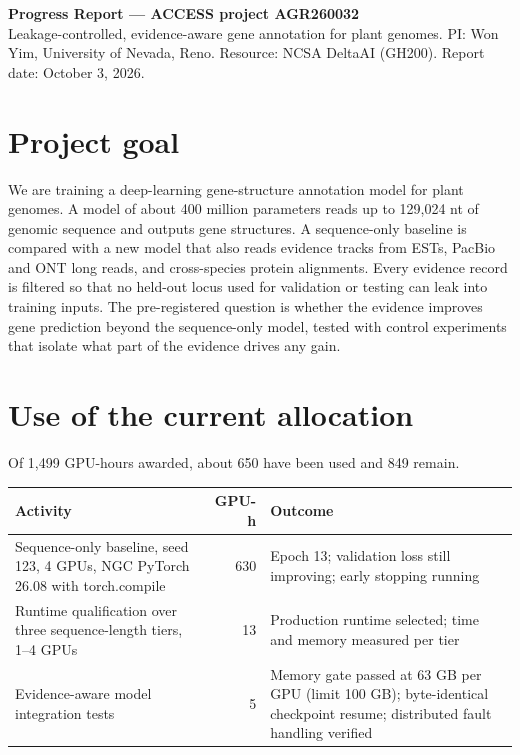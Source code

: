 \documentclass[11pt]{article}
\begin{document}
{\large\bfseries Progress Report — ACCESS project AGR260032}\\[2pt]
{\small Leakage-controlled, evidence-aware gene annotation for plant genomes. PI: Won Yim, University of Nevada, Reno. Resource: NCSA DeltaAI (GH200). Report date: October 3, 2026.}

\section{Project goal}
We are training a deep-learning gene-structure annotation model for plant genomes. A model of about 400 million parameters reads up to 129,024 nt of genomic sequence and outputs gene structures. A sequence-only baseline is compared with a new model that also reads evidence tracks from ESTs, PacBio and ONT long reads, and cross-species protein alignments. Every evidence record is filtered so that no held-out locus used for validation or testing can leak into training inputs. The pre-registered question is whether the evidence improves gene prediction beyond the sequence-only model, tested with control experiments that isolate what part of the evidence drives any gain.

\section{Use of the current allocation}
Of 1,499 GPU-hours awarded, about 650 have been used and 849 remain.

\begin{tabularx}{\linewidth}{Xrl}\toprule
Activity & GPU-h & Outcome\\\midrule
Sequence-only baseline, seed 123, 4 GPUs, NGC PyTorch 26.08 with torch.compile & 630 & Epoch 13; validation loss still improving; early stopping running\\
Runtime qualification over three sequence-length tiers, 1--4 GPUs & 13 & Production runtime selected; time and memory measured per tier\\
Evidence-aware model integration tests & 5 & Memory gate passed at 63 GB per GPU (limit 100 GB); byte-identical checkpoint resume; distributed fault handling verified\\\bottomrule
\end{tabularx}
\end{document}

